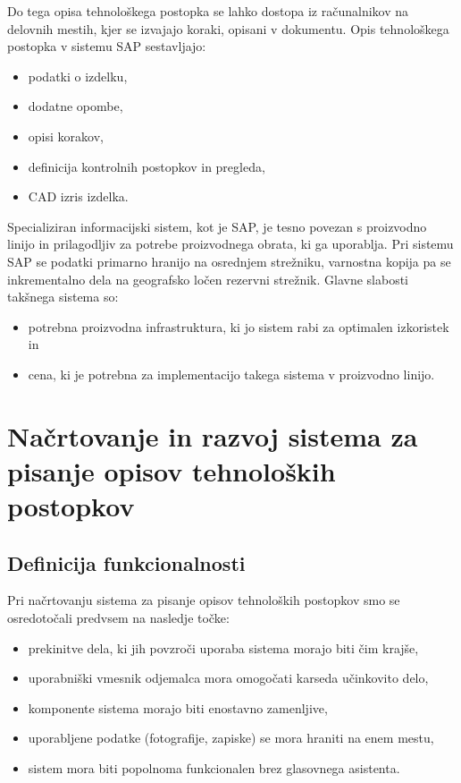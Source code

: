 \documentclass[a4paper, 12pt]{book}
\begin{document}
Do tega opisa tehnološkega postopka se lahko dostopa iz računalnikov na delovnih mestih, kjer se izvajajo koraki, opisani v dokumentu.
Opis tehnološkega postopka v sistemu SAP sestavljajo:
\begin{itemize}
	\item podatki o izdelku,
	\item dodatne opombe,
	\item opisi korakov,
	\item definicija kontrolnih postopkov in pregleda, 
	\item CAD izris izdelka.
\end{itemize}

Specializiran informacijski sistem, kot je SAP, je tesno povezan s proizvodno linijo in prilagodljiv za potrebe proizvodnega obrata, ki ga uporablja.
Pri sistemu SAP se podatki primarno hranijo na osrednjem strežniku, varnostna kopija pa se inkrementalno dela na geografsko ločen rezervni strežnik.
Glavne slabosti takšnega sistema so:
\begin{itemize}
	\item potrebna proizvodna infrastruktura, ki jo sistem rabi za optimalen izkoristek in
	\item cena, ki je potrebna za implementacijo takega sistema v proizvodno linijo.
\end{itemize}


\chapter{Načrtovanje in razvoj sistema za pisanje opisov tehnoloških postopkov}

\section{Definicija funkcionalnosti}

Pri načrtovanju sistema za pisanje opisov tehnoloških postopkov smo se osredotočali predvsem na nasledje točke:
\begin{itemize}
	\item prekinitve dela, ki jih povzroči uporaba sistema morajo biti čim krajše,
	\item uporabniški vmesnik odjemalca mora omogočati karseda učinkovito delo,
	\item komponente sistema morajo biti enostavno zamenljive,
	\item uporabljene podatke (fotografije, zapiske) se mora hraniti na enem mestu,
	\item sistem mora biti popolnoma funkcionalen brez glasovnega asistenta.
\end{itemize}
\end{document}
